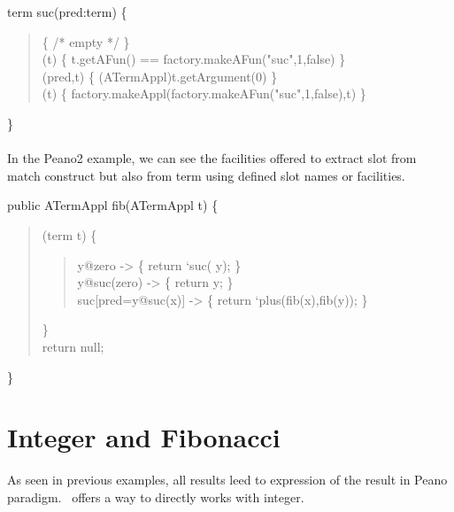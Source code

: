 \op term suc(pred:term) \{\\
\begin{quote}
  \fsym             \{ \textsf{/* empty */} \}\\
  \isfs(t)       \{ t.getAFun() == factory.makeAFun("suc",1,false) \}\\
  \getslot(pred,t) \{ (ATermAppl)t.getArgument(0) \}\\
  \make(t)          \{ factory.makeAppl(factory.makeAFun("suc",1,false),t) \}\\
\end{quote}
\}\\
\\
In the Peano2 example, we can see the facilities offered to extract
slot from match construct but also from term using defined slot names
or \@ facilities.

public ATermAppl fib(ATermAppl t) \{\\
\begin{quote}
  \match(term t) \{\\
\begin{quote}
    \textsf{y@}zero             -> \{ return `suc( \textsf{y}); \}\\
    \textsf{y@}suc(zero)        -> \{ return \textsf{y}; \}\\
    suc\textsf{[pred=y@}suc(\textsf{x})\textsf{]} -> \{ return `plus(fib(\textsf{x}),fib(\textsf{y})); \}\\
\end{quote}
  \}\\
  return null;\\
\end{quote}
\}\\

\section{Integer and Fibonacci}
As seen in previous examples, all results leed to expression of the
result in Peano paradigm. \TOM\ offers a way to directly works with
integer.

